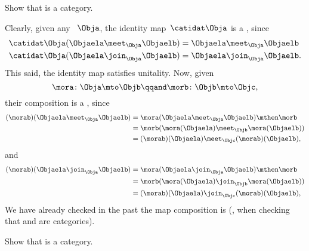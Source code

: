 \begin{exercise}
    \label{ex:lat_is_cat}
    Show that \Lat is a category.
\end{exercise}
\begin{solution}
    Clearly, given any ~$\Obja$, the identity map~$\catidat\Obja$ is a , since
    \begin{equation}
        \begin{aligned}
            \catidat\Obja(\Objaela \meet_\Obja \Objaelb) & =\Objaela \meet_\Obja \Objaelb \\
            \catidat\Obja(\Objaela \join_\Obja \Objaelb) & =\Objaela \join_\Obja \Objaelb.
        \end{aligned}
    \end{equation}
    This said, the identity map satisfies unitality.
    Now, given 
    \begin{equation}
        \mora\colon \Obja \mto \Objb
        \qqand
        \morb\colon \Objb\mto \Objc,
    \end{equation}
    their composition is a , since
    \begin{equation}
        \begin{aligned}
            (\morab)(\Objaela \meet_\Obja \Objaelb)
             & = \mora(\Objaela \meet_\Obja \Objaelb) \mthen \morb \\
             & = \morb(\mora(\Objaela) \meet_\Objb \mora(\Objaelb)) \\
             & =(\morab)(\Objaela) \meet_\Objc (\morab)(\Objaelb),
        \end{aligned}
    \end{equation}
    and
    \begin{equation}
        \begin{aligned}
            (\morab)(\Objaela \join_\Obja \Objaelb)
             & = \mora(\Objaela \join_\Obja \Objaelb) \mthen \morb \\
             & = \morb(\mora(\Objaela) \join_\Objb \mora(\Objaelb)) \\
             & =(\morab)(\Objaela) \join_\Objc (\morab)(\Objaelb),
        \end{aligned}
    \end{equation}
    We have already checked in the past the map composition is  (\eg, when checking that \Set and \Pos are categories).
\end{solution}

\begin{exercise}
    \label{ex:boundlat_is_cat}
    Show that \BoundedLat is a category.
\end{exercise}

